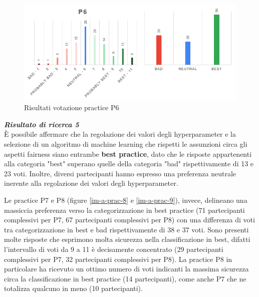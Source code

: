 \begin{figure}[h!]
    \centering
    \includegraphics[width=1\textwidth]{figure/data-analysis3/P6.png}
    \caption{Risultati votazione practice P6}
    \label{im-a-prac-7}
\end{figure}

\begin{center}
    \begin{tcolorbox}[width=400pt, colframe=black, colback=Gray!30]
		\begin{minipage}{\textwidth}
			\textit{\faKey \textbf{ Risultato di ricerca 5}}\\
			È possibile affermare che la regolazione dei valori degli hyperparameter e la selezione di un algoritmo di machine learning che rispetti le assunzioni circa gli aspetti fairness siano entrambe \textbf{best practice}, dato che le risposte appartenenti alla categoria "best" superano quelle della categoria "bad" rispettivamente di 13 e 23 voti. Inoltre, diversi partecipanti hanno espresso una preferenza neutrale inerente alla regolazione dei valori degli hyperparameter.
		\end{minipage}
	\end{tcolorbox}
\end{center}

Le practice P7 e P8 (figure \ref{im-a-prac-8} e \ref{im-a-prac-9}), invece, delineano una massiccia preferenza verso la categorizzazione in best practice (71 partecipanti complessivi per P7, 67 partecipanti complessivi per P8) con una differenza di voti tra categorizzazione in best e bad rispettivamente di 38 e 37 voti. Sono presenti molte risposte che esprimono molta sicurezza nella classificazione in best, difatti l'intervallo di voti da 9 a 11 è decisamente concentrato (29 partecipanti complessivi per P7, 32 partecipanti complessivi per P8). La practice P8 in particolare ha ricevuto un ottimo numero di voti indicanti la massima sicurezza circa la classificazione in best practice (14 partecipanti), come anche P7 che ne totalizza qualcuno in meno (10 partecipanti).

